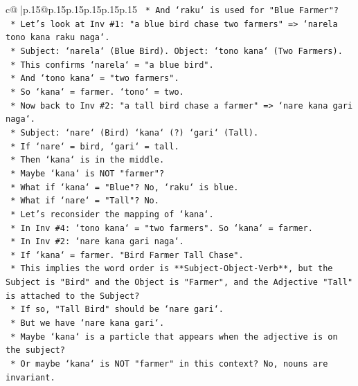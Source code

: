 \documentclass{article}
\begin{document}
{\begin{supertabular}{c@{$\;$}|p{.15\linewidth}@{}p{.15\linewidth}p{.15\linewidth}p{.15\linewidth}p{.15\linewidth}p{.15\linewidth}}
{{{\texttt{            *   And `raku` is used for "Blue Farmer"?} \\
\texttt{            *   Let's look at Inv \#1: "a blue bird chase two farmers" => `narela tono kana raku naga`.} \\
\texttt{            *   Subject: `narela` (Blue Bird). Object: `tono kana` (Two Farmers).} \\
\texttt{            *   This confirms `narela` = "a blue bird".} \\
\texttt{            *   And `tono kana` = "two farmers".} \\
\texttt{            *   So `kana` = farmer. `tono` = two.} \\
\texttt{            *   Now back to Inv \#2: "a tall bird chase a farmer" => `nare kana gari naga`.} \\
\texttt{            *   Subject: `nare` (Bird) `kana` (?) `gari` (Tall).} \\
\texttt{            *   If `nare` = bird, `gari` = tall.} \\
\texttt{            *   Then `kana` is in the middle.} \\
\texttt{            *   Maybe `kana` is NOT "farmer"?} \\
\texttt{            *   What if `kana` = "Blue"? No, `raku` is blue.} \\
\texttt{            *   What if `nare` = "Tall"? No.} \\
\texttt{            *   Let's reconsider the mapping of `kana`.} \\
\texttt{            *   In Inv \#4: `tono kana` = "two farmers". So `kana` = farmer.} \\
\texttt{            *   In Inv \#2: `nare kana gari naga`.} \\
\texttt{            *   If `kana` = farmer. "Bird Farmer Tall Chase".} \\
\texttt{            *   This implies the word order is **Subject{-}Object{-}Verb**, but the Subject is "Bird" and the Object is "Farmer", and the Adjective "Tall" is attached to the Subject?} \\
\texttt{            *   If so, "Tall Bird" should be `nare gari`.} \\
\texttt{            *   But we have `nare kana gari`.} \\
\texttt{            *   Maybe `kana` is a particle that appears when the adjective is on the subject?} \\
\texttt{            *   Or maybe `kana` is NOT "farmer" in this context? No, nouns are invariant.} \\
}}}
\end{supertabular}}
\end{document}
